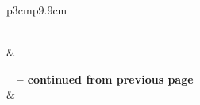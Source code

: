 \documentclass[11pt]{report}
\begin{document}
\begin{longtable}{p{3cm}p{9.9cm}}
\caption[Glossary of Terms]{Glossary of Terms} 
\label{table:glossart} \\

\hline {} &  \\ \hline 
\endfirsthead

%
{{\bfseries \tablename\ \thetable{} -- continued from previous page}} \\
\hline {} &  \\ \hline 
\endhead

 \\ \hline
\endfoot


\end{longtable}
\end{document}
